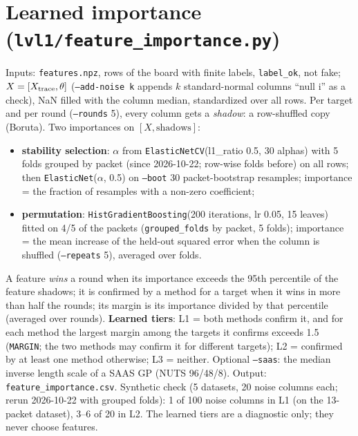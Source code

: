 \documentclass[10pt]{article}
\newcommand{\code}[1]{\texttt{#1}}
\begin{document}
\section{Learned importance (\code{lvl1/feature\_importance.py})}
\label{sec:importance}

Inputs: \code{features.npz}, rows of the board with finite labels, \code{label\_ok}, not fake; $X = [X_{\rm trace},
\theta]$ (\code{--add-noise k} appends $k$ standard-normal columns ``null i'' as a check), NaN filled with the column
median, standardized over all rows. Per target and per round (\code{--rounds} 5), every column gets a \emph{shadow}: a
row-shuffled copy (Boruta). Two importances on $[X, \text{shadows}]$:
\begin{itemize}
  \item \textbf{stability selection}: $\alpha$ from \code{ElasticNetCV}(l1\_ratio 0.5, 30 alphas) with 5 folds grouped by
        packet (since 2026-10-22; row-wise folds before) on all rows;
        then \code{ElasticNet}($\alpha$, 0.5) on \code{--boot} 30 packet-bootstrap resamples; importance = the fraction of
        resamples with a non-zero coefficient;
  \item \textbf{permutation}: \code{HistGradientBoosting}(200 iterations, lr 0.05, 15 leaves) fitted on 4/5 of the
        packets (\code{grouped\_folds} by packet, 5 folds); importance = the mean increase of the held-out squared error
        when the column is shuffled (\code{--repeats} 5), averaged over folds.
\end{itemize}
A feature \emph{wins} a round when its importance exceeds the 95th percentile of the feature shadows; it is confirmed by a
method for a target when it wins in more than half the rounds; its margin is its importance divided by that percentile
(averaged over rounds). \textbf{Learned tiers}: L1 = both methods confirm it, and for each method the largest margin
among the targets it confirms exceeds 1.5 (\code{MARGIN}; the two methods may confirm it for different targets); L2 =
confirmed by at least one method otherwise; L3 = neither. Optional
\code{--saas}: the median inverse length scale of a SAAS GP (NUTS 96/48/8). Output: \code{feature\_importance.csv}.
Synthetic check (5 datasets, 20 noise columns each; rerun 2026-10-22 with grouped folds): 1 of 100 noise columns in L1
(on the 13-packet dataset), 3--6 of 20 in L2. The learned tiers are a
diagnostic only; they never choose features.

\end{document}
